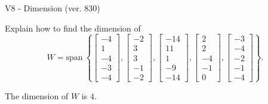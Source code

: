 \begin{exercise}
  \begin{exerciseTitle}V8 - Dimension (ver. 830)\end{exerciseTitle}
  \begin{exerciseStatement}
    Explain how to find the dimension of 
\[W=\mathrm{span}\ \left\{\left[\begin{array}{r}
-4 \\
1 \\
-4 \\
-3 \\
-4
\end{array}\right] , \left[\begin{array}{r}
-2 \\
3 \\
3 \\
-1 \\
-2
\end{array}\right] , \left[\begin{array}{r}
-14 \\
11 \\
1 \\
-9 \\
-14
\end{array}\right] , \left[\begin{array}{r}
2 \\
2 \\
-4 \\
-1 \\
0
\end{array}\right] , \left[\begin{array}{r}
-3 \\
-4 \\
-2 \\
-1 \\
-4
\end{array}\right]\right\}.\]



  \end{exerciseStatement}
  \begin{exerciseAnswer}
   The dimension of \(W\) is  \(4\).
  


  \end{exerciseAnswer}
\end{exercise}